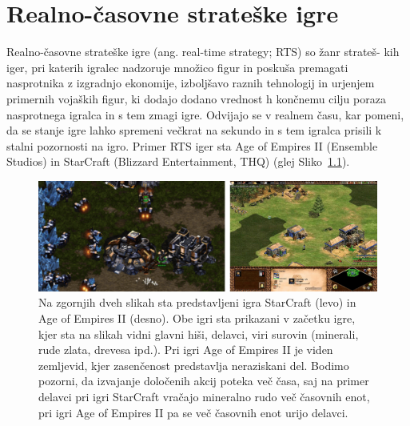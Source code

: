 \documentclass[a4paper, 12pt]{book}
\begin{document}

\chapter{Realno-časovne strateške igre}
\label{chrts}

Realno-časovne strateške igre (ang. real-time strategy; RTS) so žanr strateš- kih iger, pri katerih igralec nadzoruje množico figur in poskuša premagati nasprotnika z izgradnjo ekonomije, izboljšavo raznih tehnologij in urjenjem primernih vojaških figur, ki dodajo dodano vrednost h končnemu cilju poraza nasprotnega igralca in s tem zmagi igre.
Odvijajo se v realnem času, kar pomeni, da se stanje igre lahko spremeni večkrat na sekundo in s tem igralca prisili k stalni pozornosti na igro.
Primer RTS iger sta Age of Empires II (Ensemble Studios) in StarCraft (Blizzard Entertainment, THQ) (glej Sliko~{\ref{picRtsGames}}). 

\begin{figure}[h!]
	\begin{center}
		\includegraphics[width=1.0\textwidth]{photos/horizontal_rts.pdf}
	\end{center}
	\caption{Na zgornjih dveh slikah sta predstavljeni igra StarCraft (levo) in Age of Empires II (desno). 
		Obe igri sta prikazani v začetku igre, kjer sta na slikah vidni glavni hiši, delavci, viri surovin (minerali, rude zlata, drevesa ipd.).
		Pri igri Age of Empires II je viden zemljevid, kjer zasenčenost predstavlja neraziskani del. 
		Bodimo pozorni, da izvajanje določenih akcij poteka več časa, saj na primer delavci pri igri StarCraft vračajo mineralno rudo več časovnih enot, pri igri Age of Empires II pa se več časovnih enot urijo delavci.}
	\label{picRtsGames}
\end{figure}
\end{document}
